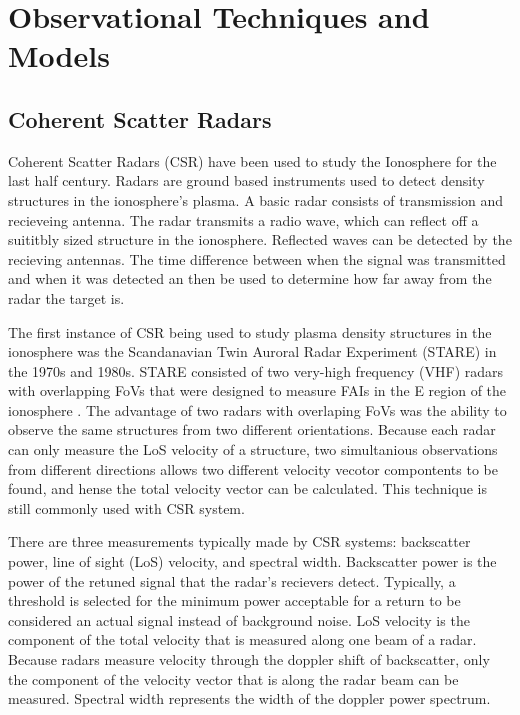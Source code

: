 \section{Observational Techniques and Models}


\subsection{Coherent Scatter Radars}
\label{sec:csr}

Coherent Scatter Radars (CSR) have been used to study the Ionosphere for the last half century.  Radars are ground based instruments used to detect density structures in the ionosphere's plasma.  A basic radar consists of transmission and recieveing antenna.  The radar transmits a radio wave, which can reflect off a suititbly sized structure in the ionosphere.  Reflected waves can be detected by the recieving antennas.  The time difference between when the signal was transmitted and when it was detected  an then be used to determine how far away from the radar the target is.

The first instance of CSR being used to study plasma density structures in the ionosphere was the Scandanavian Twin Auroral Radar Experiment (STARE) in the 1970s and 1980s.  STARE consisted of two very-high frequency (VHF) radars with overlapping FoVs that were designed to measure FAIs in the E region of the ionosphere \citep{Greenwald1997}.  The advantage of two radars with overlaping FoVs was the ability to observe the same structures from two different orientations.  Because each radar can only measure the LoS velocity of a structure, two simultanious observations from different directions allows two different velocity vecotor compontents to be found, and hense the total velocity vector can be calculated.  This technique is still commonly used with CSR system.

There are three measurements typically made by CSR systems: backscatter power, line of sight (LoS) velocity, and spectral width.  Backscatter power is the power of the retuned signal that the radar's recievers detect.  Typically, a threshold is selected for the minimum power acceptable for a return to be considered an actual signal instead of background noise.  LoS velocity is the component of the total velocity that is measured along one beam of a radar.  Because radars measure velocity through the doppler shift of backscatter, only the component of the velocity vector that is along the radar beam can be measured.  Spectral width represents the width of the doppler power spectrum.

